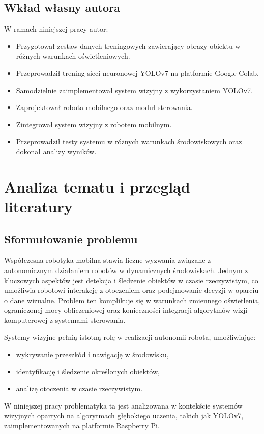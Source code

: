 \documentclass[a4paper,twoside,12pt]{book}
\begin{document}
\section{Wkład własny autora}
W ramach niniejszej pracy autor:
\begin{itemize}
    \item Przygotował zestaw danych treningowych zawierający obrazy obiektu w różnych warunkach oświetleniowych.
    \item Przeprowadził trening sieci neuronowej YOLOv7 na platformie Google Colab.
    \item Samodzielnie zaimplementował system wizyjny z wykorzystaniem YOLOv7.
    \item Zaprojektował robota mobilnego oraz moduł sterowania.
    \item Zintegrował system wizyjny z robotem mobilnym.
    \item Przeprowadził testy systemu w różnych warunkach środowiskowych oraz dokonał analizy wyników.
\end{itemize}


\chapter{Analiza tematu i przegląd literatury}

\label{ch:analiza}

\section{Sformułowanie problemu}
Współczesna robotyka mobilna stawia liczne wyzwania związane z autonomicznym działaniem robotów w dynamicznych środowiskach. Jednym z kluczowych aspektów jest detekcja i śledzenie obiektów w czasie rzeczywistym, co umożliwia robotowi interakcję z otoczeniem oraz podejmowanie decyzji w oparciu o dane wizualne. Problem ten komplikuje się w warunkach zmiennego oświetlenia, ograniczonej mocy obliczeniowej oraz konieczności integracji algorytmów wizji komputerowej z systemami sterowania.

Systemy wizyjne pełnią istotną rolę w realizacji autonomii robota, umożliwiając:
\begin{itemize}
    \item wykrywanie przeszkód i nawigację w środowisku,
    \item identyfikację i śledzenie określonych obiektów,
    \item analizę otoczenia w czasie rzeczywistym.
\end{itemize}
W niniejszej pracy problematyka ta jest analizowana w kontekście systemów wizyjnych opartych na algorytmach głębokiego uczenia, takich jak YOLOv7, zaimplementowanych na platformie Raspberry Pi.
\end{document}
